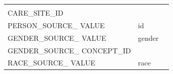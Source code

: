 \documentclass[10.5pt]{book}
\theoremstyle{definition}
\theoremstyle{definition}
\theoremstyle{definition}
\theoremstyle{remark}
\begin{document}
\begin{longtable}[]{@{}lll@{}}
\begin{minipage}[t]{0.13\columnwidth}
\strut
\end{minipage} & \begin{minipage}[t]{0.50\columnwidth}\raggedright\strut
\strut
\end{minipage}\tabularnewline
\begin{minipage}[t]{0.28\columnwidth}\raggedright\strut
CARE\_SITE\_ID\strut
\end{minipage} & \begin{minipage}[t]{0.13\columnwidth}\raggedright\strut
\strut
\end{minipage} & \begin{minipage}[t]{0.50\columnwidth}\raggedright\strut
\strut
\end{minipage}\tabularnewline
\begin{minipage}[t]{0.28\columnwidth}\raggedright\strut
PERSON\_SOURCE\_ VALUE\strut
\end{minipage} & \begin{minipage}[t]{0.13\columnwidth}\raggedright\strut
id\strut
\end{minipage} & \begin{minipage}[t]{0.50\columnwidth}\raggedright\strut
\strut
\end{minipage}\tabularnewline
\begin{minipage}[t]{0.28\columnwidth}\raggedright\strut
GENDER\_SOURCE\_ VALUE\strut
\end{minipage} & \begin{minipage}[t]{0.13\columnwidth}\raggedright\strut
gender\strut
\end{minipage} & \begin{minipage}[t]{0.50\columnwidth}\raggedright\strut
\strut
\end{minipage}\tabularnewline
\begin{minipage}[t]{0.28\columnwidth}\raggedright\strut
GENDER\_SOURCE\_ CONCEPT\_ID\strut
\end{minipage} & \begin{minipage}[t]{0.13\columnwidth}\raggedright\strut
\strut
\end{minipage} & \begin{minipage}[t]{0.50\columnwidth}\raggedright\strut
\strut
\end{minipage}\tabularnewline
\begin{minipage}[t]{0.28\columnwidth}\raggedright\strut
RACE\_SOURCE\_ VALUE\strut
\end{minipage} & \begin{minipage}[t]{0.13\columnwidth}\raggedright\strut
race\strut
\end{minipage} & \begin{minipage}[t]{0.50\columnwidth}\raggedright\strut

\end{minipage}
\end{longtable}
\end{document}
